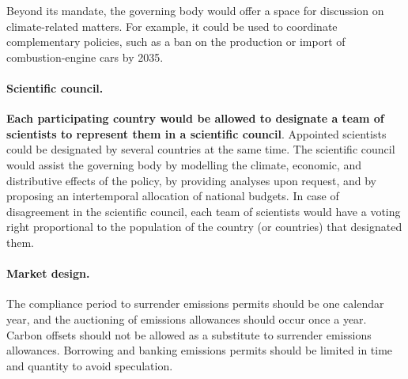 \documentclass[12pt,english]{article}
\begin{document}
Beyond its mandate, the governing body would offer a space for discussion on climate-related matters. For example, it could be used to coordinate complementary policies, such as a ban on the production or import of combustion-engine cars by 2035.

\paragraph{Scientific council.}
\textbf{Each participating country would be allowed to designate a team of scientists to represent them in a scientific council}. Appointed scientists could be designated by several countries at the same time. The scientific council would assist the governing body by modelling the climate, economic, and distributive effects of the policy, by providing analyses upon request, and by proposing an intertemporal allocation of national budgets. In case of disagreement in the scientific council, each team of scientists would have a voting right proportional to the population %
of the country (or countries) that designated them.


\paragraph{Market design.} 
The compliance period to surrender emissions permits should be one calendar year, and the auctioning of emissions allowances should occur once a year. Carbon offsets should not be allowed as a substitute to surrender emissions allowances. Borrowing and banking emissions permits should be limited in time and quantity to avoid speculation. %

\end{document}
